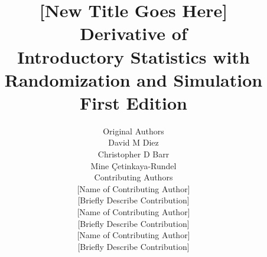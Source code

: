 

\title{\huge [New Title Goes Here] \\[2mm]
\large Derivative of \\
Introductory Statistics with Randomization and Simulation \\
First Edition}
\author{\Large Original Authors \\[1.5mm]
\normalsize David M Diez \\
\normalsize Christopher D Barr \\
\normalsize Mine \c{C}etinkaya-Rundel \\[8mm]
\Large Contributing Authors \\[1.5mm]
\normalsize [Name of Contributing Author] \\
\small [Briefly Describe Contribution] \\[2mm]
\normalsize [Name of Contributing Author] \\
\small [Briefly Describe Contribution] \\[2mm]
\normalsize [Name of Contributing Author] \\
\small [Briefly Describe Contribution] \\[2mm]
}

